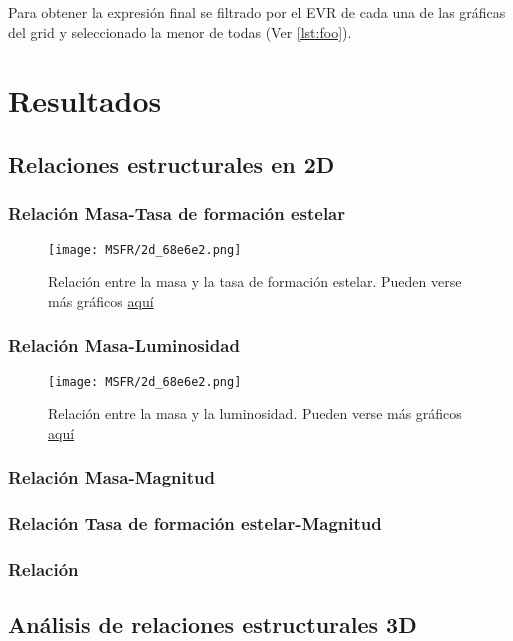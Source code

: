 \documentclass[11pt, a4paper]{article} %
\begin{document}
Para obtener la expresión final se filtrado por el EVR de cada una de las gráficas del grid y seleccionado la menor de todas (Ver \ref{lst:foo}).



\section{Resultados}

\subsection{Relaciones estructurales en 2D}
\subsubsection{Relación Masa-Tasa de formación estelar}
\begin{figure}[H]
    \centering
    \texttt{[image: MSFR/2d\_68e6e2.png]}
    \caption{Relación entre la masa y la tasa de formación estelar. Pueden verse más gráficos \href{https://github.com/PhyAMR/TFG/tree/main/MSFR}{aquí}}
    \label{fig:MSFR}
\end{figure}
\subsubsection{Relación Masa-Luminosidad}

\begin{figure}[H]
    \centering
    \texttt{[image: MSFR/2d\_68e6e2.png]}
    \caption{Relación entre la masa y la luminosidad. Pueden verse más gráficos \href{URL}{aquí}}
    \label{fig:LM}
\end{figure}
\subsubsection{Relación Masa-Magnitud}
\subsubsection{Relación Tasa de formación estelar-Magnitud}
\subsubsection{Relación }
\subsection{Análisis de relaciones estructurales 3D}
\end{document}

